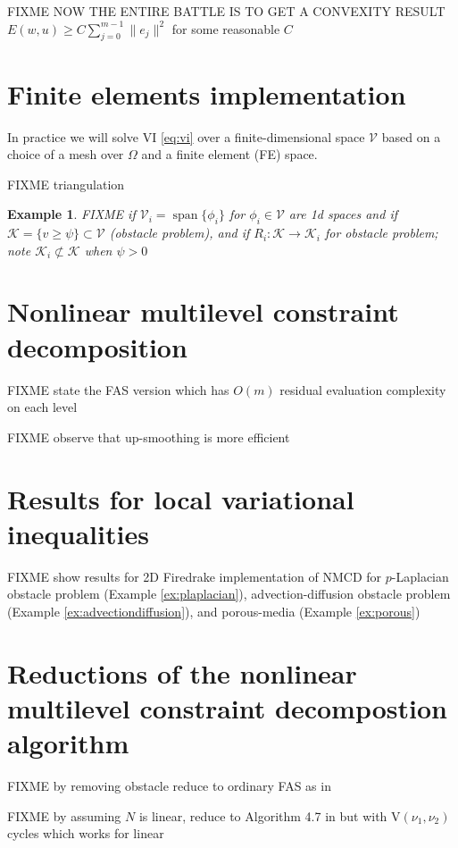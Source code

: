 \documentclass[letterpaper,final,12pt,reqno]{amsart}
\theoremstyle{cstyle}
\theoremstyle{cstyle*}
\theoremstyle{dstyle}
\newtheorem{example}[theorem]{Example}
\numberwithin{equation}{section}
\numberwithin{figure}{section}
\numberwithin{table}{section}
\numberwithin{theorem}{section}
\newcommand{\cK}{\mathcal{K}}
\newcommand{\cV}{\mathcal{V}}
\newcommand{\Span}{\operatorname{span}}
\begin{document}
FIXME NOW THE ENTIRE BATTLE IS TO GET A CONVEXITY RESULT $E(w,u) \ge C \sum_{j=0}^{m-1} \|e_j\|^2$ for some reasonable $C$


\section{Finite elements implementation} \label{sec:fe}

In practice we will solve VI \eqref{eq:vi} over a finite-dimensional space $\cV$ based on a choice of a mesh over $\Omega$ and a finite element (FE) space.

FIXME triangulation

\begin{example}  FIXME if $\cV_i=\Span\{\phi_i\}$ for $\phi_i\in\cV$ are 1d spaces and if $\cK = \{v \ge \psi\} \subset \cV$ (obstacle problem), and if $R_i : \cK \to \cK_i$ for obstacle problem; note $\cK_i \not\subset \cK$ when $\psi>0$
\end{example}


\section{Nonlinear multilevel constraint decomposition} \label{sec:multilevel}

FIXME state the FAS version which has $O(m)$ residual evaluation complexity on each level

FIXME observe that up-smoothing is more efficient


\section{Results for local variational inequalities} \label{sec:results}

FIXME show results for 2D Firedrake implementation of NMCD for $p$-Laplacian obstacle problem (Example \ref{ex:plaplacian}), advection-diffusion obstacle problem (Example \ref{ex:advectiondiffusion}), and porous-media (Example \ref{ex:porous})







\appendix
\section{Reductions of the nonlinear multilevel constraint decompostion algorithm}

FIXME by removing obstacle reduce to ordinary FAS as in \cite{Bruneetal2015}

FIXME by assuming $N$ is linear, reduce to Algorithm 4.7 in \cite{GraeserKornhuber2009} but with $\text{V}(\nu_1,\nu_2)$ cycles which works for linear
\end{document}
